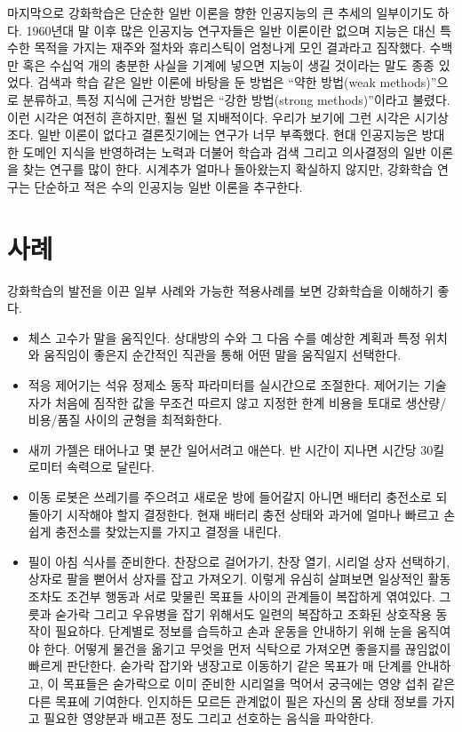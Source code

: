마지막으로 강화학습은 단순한 일반 이론을 향한 인공지능의 큰 추세의 일부이기도
하다. 1960년대 말 이후 많은 인공지능 연구자들은 일반 이론이란 없으며 지능은 대신
특수한 목적을 가지는 재주와 절차와 휴리스틱이 엄청나게 모인 결과라고 짐작했다.
수백만 혹은 수십억 개의 충분한 사실을 기계에 넣으면 지능이 생길 것이라는 말도
종종 있었다. 검색과 학습 같은 일반 이론에 바탕을 둔 방법은 ``약한 방법(weak
methods)''으로 분류하고, 특정 지식에 근거한 방법은 ``강한 방법(strong
methods)''이라고 불렸다. 이런 시각은 여전히 흔하지만, 훨씬 덜 지배적이다. 우리가
보기에 그런 시각은 시기상조다. 일반 이론이 없다고 결론짓기에는 연구가 너무
부족했다. 현대 인공지능은 방대한 도메인 지식을 반영하려는 노력과 더불어 학습과
검색 그리고 의사결정의 일반 이론을 찾는 연구를 많이 한다. 시계추가 얼마나
돌아왔는지 확실하지 않지만, 강화학습 연구는 단순하고 적은 수의 인공지능 일반
이론을 추구한다.

\section{사례}

강화학습의 발전을 이끈 일부 사례와 가능한 적용사례를 보면 강화학습을 이해하기
좋다.

\begin{itemize}
\item 체스 고수가 말을 움직인다. 상대방의 수와 그 다음 수를 예상한 계획과
      특정 위치와 움직임이 좋은지 순간적인 직관을 통해 어떤 말을 움직일지
      선택한다.
\item 적응 제어기는 석유 정제소 동작 파라미터를 실시간으로 조절한다. 제어기는
      기술자가 처음에 짐작한 값을 무조건 따르지 않고 지정한 한계 비용을 토대로
      생산량/비용/품질 사이의 균형을 최적화한다.
\item 새끼 가젤은 태어나고 몇 분간 일어서려고 애쓴다. 반 시간이 지나면 시간당
      30킬로미터 속력으로 달린다.
\item 이동 로봇은 쓰레기를 주으려고 새로운 방에 들어갈지 아니면 배터리 충전소로
      되돌아기 시작해야 할지 결정한다. 현재 배터리 충전 상태와 과거에 얼마나
      빠르고 손쉽게 충전소를 찾았는지를 가지고 결정을 내린다.
\item 필이 아침 식사를 준비한다. 찬장으로 걸어가기, 찬장 열기, 시리얼 상자
      선택하기, 상자로 팔을 뻗어서 상자를 잡고 가져오기. 이렇게 유심히 살펴보면
      일상적인 활동조차도 조건부 행동과 서로 맞물린 목표들 사이의 관계들이
      복잡하게 엮여있다. 그릇과 숟가락 그리고 우유병을 잡기 위해서도 일련의
      복잡하고 조화된 상호작용 동작이 필요하다. 단계별로 정보를 습득하고 손과
      운동을 안내하기 위해 눈을 움직여야 한다. 어떻게 물건을 옮기고 무엇을 먼저
      식탁으로 가져오면 좋을지를 끊임없이 빠르게 판단한다. 숟가락 잡기와
      냉장고로 이동하기 같은 목표가 매 단계를 안내하고, 이 목표들은 숟가락으로
      이미 준비한 시리얼을 먹어서 궁극에는 영양 섭취 같은 다른 목표에 기여한다.
      인지하든 모르든 관계없이 필은 자신의 몸 상태 정보를 가지고 필요한 영양분과
      배고픈 정도 그리고 선호하는 음식을 파악한다.
\end{itemize}

